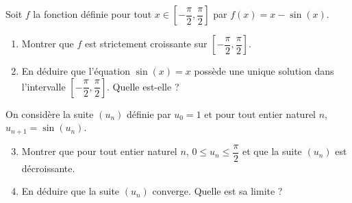 \documentclass[11pt,fleqn, openany]{book} %
\begin{document}
\begin{exercise}[topic=trig02]Soit $f$ la fonction définie pour tout $x \in \left[-\dfrac{\pi}{2},\dfrac{\pi}{2}\right]$ par $f(x)=x-\sin(x)$.
\begin{enumerate}
\item Montrer que $f$ est strictement croissante sur $\left[-\dfrac{\pi}{2},\dfrac{\pi}{2}\right]$.
\item En déduire que l'équation $\sin(x)=x$ possède une unique solution dans l'intervalle $\left[-\dfrac{\pi}{2},\dfrac{\pi}{2}\right]$. Quelle est-elle ?
\end{enumerate}
On considère la suite $(u_n)$ définie par $u_0=1$ et pour tout entier naturel $n$, $u_{n+1}=\sin(u_n)$.
\begin{enumerate}
\setcounter{enumi}{2}
\item Montrer que pour tout entier naturel $n$, $0 \leqslant u_n \leqslant \dfrac{\pi}{2}$ et que la suite $(u_n)$ est décroissante.
\item En déduire que la suite $(u_n)$ converge. Quelle est sa limite ?
\end{enumerate}\end{exercise}
\end{document}

